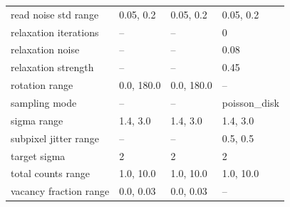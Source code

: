 \begin{longtable}{p{2.0in}p{1.15in}p{1.15in}p{1.15in}}
read noise std range & 0.05, 0.2 & 0.05, 0.2 & 0.05, 0.2\\
relaxation iterations & -- & -- & 0\\
relaxation noise & -- & -- & 0.08\\
relaxation strength & -- & -- & 0.45\\
rotation range & 0.0, 180.0 & 0.0, 180.0 & --\\
sampling mode & -- & -- & poisson\_disk\\
sigma range & 1.4, 3.0 & 1.4, 3.0 & 1.4, 3.0\\
subpixel jitter range & -- & -- & 0.5, 0.5\\
target sigma & 2 & 2 & 2\\
total counts range & 1.0, 10.0 & 1.0, 10.0 & 1.0, 10.0\\
vacancy fraction range & 0.0, 0.03 & 0.0, 0.03 & --\\
\hline\end{longtable}
\normalsize
